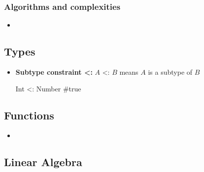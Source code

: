 \documentclass{report}
\begin{document}
    \pagebreak 
    \subsubsection{Algorithms and complexities}
    \begin{itemize}
        \item \relax
    \end{itemize}



    \pagebreak 
    \bigbreak \noindent 
    \subsection{Types}
    \bigbreak \noindent 
    \begin{itemize}
        \item \textbf{Subtype constraint <:} $A$ <: $B$ means $A$ is a subtype of $B$
            \bigbreak \noindent 
            \begin{jlcode}
            Int <: Number #true
            \end{jlcode}
    \end{itemize}

    \pagebreak 
    \subsection{Functions}
    \begin{itemize}
        \item \relax    
    \end{itemize}

    \pagebreak 
    \subsection{Linear Algebra}
    \bigbreak \noindent 
\end{document}

